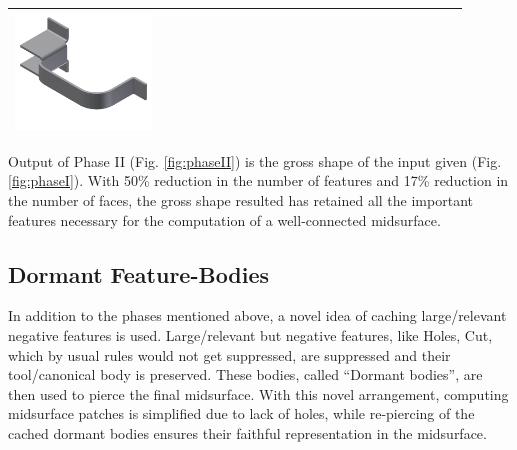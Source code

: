 \begin{minipage}[t]{\linewidth}
\begin{tabular}[h]{@{} p{0.3\linewidth} p{0.3\linewidth}  p{0.3\linewidth}@{}}
\includegraphics[width=0.98\linewidth]{..//Common/images/DefeatBracketPhase_II_3} \\ \bottomrule

\end{tabular}
\label{fig:phaseII}
\end{minipage}

Output of Phase II (Fig. \ref{fig:phaseII}) is the gross shape of the input given (Fig. \ref{fig:phaseI}). With 50\% reduction in the number of features and 17\% reduction in the number of faces, the gross shape resulted has retained all the important features necessary for the computation of a well-connected midsurface.

\subsection{Dormant Feature-Bodies}\label{sec:dormant}

In addition to the phases mentioned above, a novel idea of caching large/relevant negative features is used.  Large/relevant but negative features, like Holes, Cut, which by usual rules would not get suppressed, are suppressed and their tool/canonical body is preserved. These bodies, called ``Dormant bodies'', are then used to pierce the final midsurface. With this novel arrangement, computing midsurface patches is simplified due to lack of holes, while re-piercing of the cached dormant bodies ensures their faithful representation in the midsurface.


